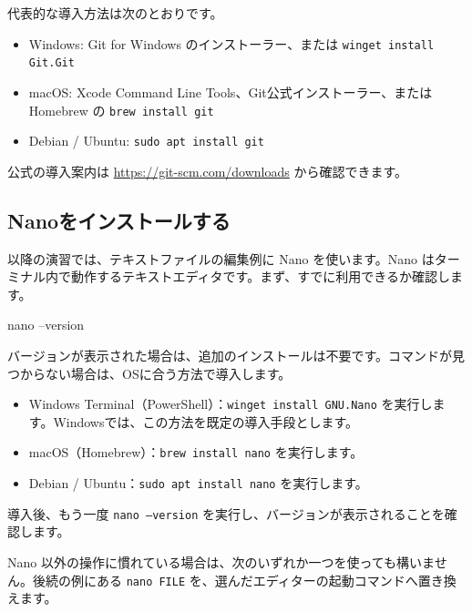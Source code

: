 \documentclass[a4paper,11pt]{jlreq}
\newcommand{\cmd}[1]{\texttt{#1}}
\begin{document}
代表的な導入方法は次のとおりです。

\begin{itemize}
  \item Windows: Git for Windows のインストーラー、または \cmd{winget install Git.Git}
  \item macOS: Xcode Command Line Tools、Git公式インストーラー、または Homebrew の \cmd{brew install git}
  \item Debian / Ubuntu: \cmd{sudo apt install git}
\end{itemize}

公式の導入案内は \url{https://git-scm.com/downloads} から確認できます。

\subsection{Nanoをインストールする}

以降の演習では、テキストファイルの編集例に Nano を使います。Nano はターミナル内で動作するテキストエディタです。まず、すでに利用できるか確認します\cite{nano-download}。

\begin{codeblock}
nano --version
\end{codeblock}

バージョンが表示された場合は、追加のインストールは不要です。コマンドが見つからない場合は、OSに合う方法で導入します。

\begin{itemize}
  \item Windows Terminal（PowerShell）：\cmd{winget install GNU.Nano} を実行します。Windowsでは、この方法を既定の導入手段とします\cite{winget-nano-manifest}。
  \item macOS（Homebrew）：\cmd{brew install nano} を実行します\cite{homebrew-nano}。
  \item Debian / Ubuntu：\cmd{sudo apt install nano} を実行します\cite{ubuntu-nano}。
\end{itemize}

導入後、もう一度 \cmd{nano --version} を実行し、バージョンが表示されることを確認します。

Nano 以外の操作に慣れている場合は、次のいずれか一つを使っても構いません。後続の例にある \cmd{nano FILE} を、選んだエディターの起動コマンドへ置き換えます。
\end{document}
